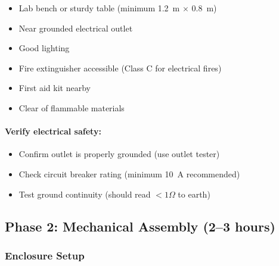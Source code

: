 \documentclass[11pt]{article}
\begin{document}
\begin{itemize}
\item Lab bench or sturdy table (minimum 1.2~m $\times$ 0.8~m)
\item Near grounded electrical outlet
\item Good lighting
\item Fire extinguisher accessible (Class C for electrical fires)
\item First aid kit nearby
\item Clear of flammable materials
\end{itemize}

\paragraph{Verify electrical safety:}

\begin{itemize}
\item Confirm outlet is properly grounded (use outlet tester)
\item Check circuit breaker rating (minimum 10~A recommended)
\item Test ground continuity (should read $<1\Omega$ to earth)
\end{itemize}

\subsection{Phase 2: Mechanical Assembly (2--3 hours)}

\subsubsection{Enclosure Setup}
\end{document}
